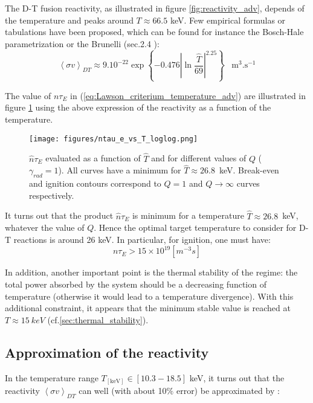 The D-T fusion reactivity, as illustrated in figure \ref{fig:reactivity_adv}, depends of the temperature and peaks around $T \approx 66.5$ keV. Few empirical formulas or tabulations have been proposed, which can be found for instance the Bosch-Hale parametrization \cite[sec.9.8]{Hartwig2016} or the Brunelli (sec.2.4 ):
\begin{equation}
\left< \sigma v \right>_{DT} \approx 9.10^{-22}
\exp\left\{ -0.476 \left| \ln\frac{\hat T}{69} \right|^{2.25}\right\}
\;\;\;\textrm{m}^3.\textrm{s}^{-1}
\end{equation}
 
The value of $n \tau_E$ in (\ref{eq:Lawson_criterium_temperature_adv}) are illustrated in figure \ref{fig:ntau_E_vs_T_adv} using the above expression of the reactivity as a function of the temperature.

\begin{figure}[h]
	\begin{center}
	\texttt{[image: figures/ntau\_e\_vs\_T\_loglog.png]}
	\end{center}
    \caption{$\hat n \tau_E$ evaluated as a function of $\hat T$ and for different values of $Q$ ($\gamma_{rad}=1$). All curves have a minimum for $\hat T\approx 26.8$~keV. Break-even and ignition contours correspond to $Q=1$ and $Q \to\infty$ curves respectively.}
	\label{fig:ntau_E_vs_T_adv}
\end{figure}


It turns out that the product $\hat n \tau_E$ is minimum for a temperature $\hat T\approx 26.8$~keV, whatever the value of $Q$. Hence the optimal target temperature to consider for D-T reactions is around 26 \si{keV}. In particular, for ignition, one must have:
\begin{equation*}
    n \tau_E > 15 \times 10^{19} \left[ \si{m^{-3} s }\right] 
\end{equation*}

In addition, another important point is the thermal stability of the regime: the total power absorbed by the system should be a decreasing function of temperature (otherwise it would lead to a temperature divergence). With this additional constraint, it appears that the minimum stable value is reached at $T\approx 15~\si{keV}$ (cf.\ref{sec:thermal_stability}).


\subsection{Approximation of the reactivity}
In the temperature range $T_{\mathrm{[keV]}} \in [10.3-18.5]$ keV, it turns out that the reactivity $\left< \sigma v \right>_{DT}$ can well (with about 10$\%$ error) be approximated by \cite[(1.5.4)]{Wesson2004}: 

